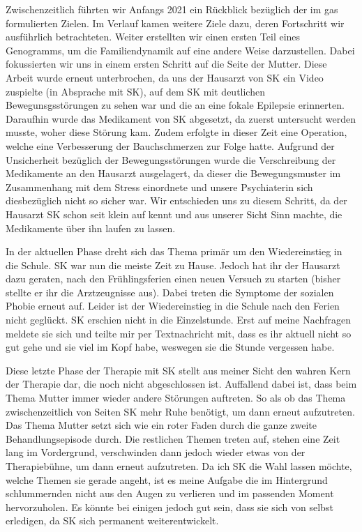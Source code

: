 Zwischenzeitlich führten wir Anfangs 2021 ein Rückblick bezüglich der im \ac{gas} formulierten Zielen. Im Verlauf kamen weitere Ziele dazu, deren Fortschritt wir ausführlich betrachteten. Weiter erstellten wir einen ersten Teil eines Genogramms, um die Familiendynamik auf eine andere Weise darzustellen. Dabei fokussierten wir uns in einem ersten Schritt auf die Seite der Mutter. Diese Arbeit wurde erneut unterbrochen, da uns der Hausarzt von SK ein Video zuspielte (in Absprache mit SK), auf dem SK mit deutlichen Bewegunsgsstörungen zu sehen war und die an eine fokale Epilepsie erinnerten. Daraufhin wurde das Medikament von SK abgesetzt, da zuerst untersucht werden musste, woher diese Störung kam. Zudem erfolgte in dieser Zeit eine Operation, welche eine Verbesserung der Bauchschmerzen zur Folge hatte. Aufgrund der Unsicherheit bezüglich der Bewegungsstörungen wurde die Verschreibung der Medikamente an den Hausarzt ausgelagert, da dieser die Bewegungsmuster im Zusammenhang mit dem Stress einordnete und unsere Psychiaterin sich diesbezüglich nicht so sicher war. Wir entschieden uns zu diesem Schritt, da der Hausarzt SK schon seit klein auf kennt und aus unserer Sicht Sinn machte, die Medikamente über ihn laufen zu lassen. 

In der aktuellen Phase dreht sich das Thema primär um den Wiedereinstieg in die Schule. SK war nun die meiste Zeit zu Hause. Jedoch hat ihr der Hausarzt dazu geraten, nach den Frühlingsferien einen neuen Versuch zu starten (bisher stellte er ihr die Arztzeugnisse aus). Dabei treten die Symptome der sozialen Phobie erneut auf. Leider ist der Wiedereinstieg in die Schule nach den Ferien nicht geglückt. SK erschien nicht in die Einzelstunde. Erst auf meine Nachfragen meldete sie sich und teilte mir per Textnachricht mit, dass es ihr aktuell nicht so gut gehe und sie viel im Kopf habe, weswegen sie die Stunde vergessen habe. 

Diese letzte Phase der Therapie mit SK stellt aus meiner Sicht den wahren Kern der Therapie dar, die noch nicht abgeschlossen ist. Auffallend dabei ist, dass beim Thema Mutter immer wieder andere Störungen auftreten. So als ob das Thema zwischenzeitlich von Seiten SK mehr Ruhe benötigt, um dann erneut aufzutreten. Das Thema Mutter setzt sich wie ein roter Faden durch die ganze zweite Behandlungsepisode durch. Die restlichen Themen treten auf, stehen eine Zeit lang im Vordergrund, verschwinden dann jedoch wieder etwas von der Therapiebühne, um dann erneut aufzutreten. Da ich SK die Wahl lassen möchte, welche Themen sie gerade angeht, ist es meine Aufgabe die im Hintergrund schlummernden nicht aus den Augen zu verlieren und im passenden Moment hervorzuholen. Es könnte bei einigen jedoch gut sein, dass sie sich von selbst erledigen, da SK sich permanent weiterentwickelt.



